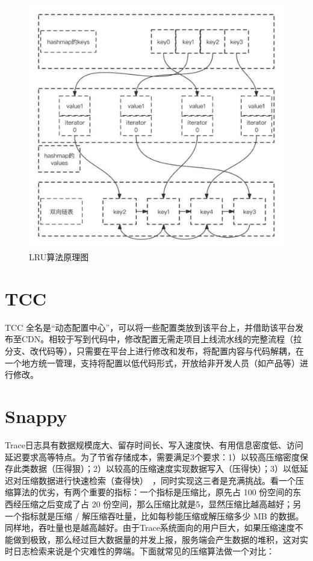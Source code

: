 \begin{figure}[htb]
  \centering
  \includegraphics[width=5in]{figure/chapter2/LRU算法原理图.pdf}
  \caption{LRU算法原理图}\label{LRU}
\end{figure}
\section{TCC} 
TCC 全名是“动态配置中心”，可以将一些配置类放到该平台上，并借助该平台发布至CDN。相较于写到代码中，修改配置无需走项目上线流水线的完整流程（拉分支、改代码等），只需要在平台上进行修改和发布，将配置内容与代码解耦，在一个地方统一管理，支持将配置以低代码形式，开放给非开发人员（如产品等）进行修改。

\section{Snappy} 
Trace日志具有数据规模庞大、留存时间长、写入速度快、有用信息密度低、访问延迟要求高等特点。为了节省存储成本，需要满足3个要求：1）以较高压缩密度保存此类数据（压得狠）；2）以较高的压缩速度实现数据写入（压得快）；3）以低延迟对压缩数据进行快速检索（查得快）~\cite{魏钧宇2023数据模式感知的低成本云日志存储系统}，同时实现这三者是充满挑战。看一个压缩算法的优劣，有两个重要的指标：一个指标是压缩比，原先占 100 份空间的东西经压缩之后变成了占 20 份空间，那么压缩比就是5，显然压缩比越高越好；另一个指标就是压缩 / 解压缩吞吐量，比如每秒能压缩或解压缩多少 MB 的数据。同样地，吞吐量也是越高越好。由于Trace系统面向的用户巨大，如果压缩速度不能做到极致，那么经过巨大数据量的并发上报，服务端会产生数据的堆积，这对实时日志检索来说是个灾难性的弊端。下面就常见的压缩算法做一个对比： 

